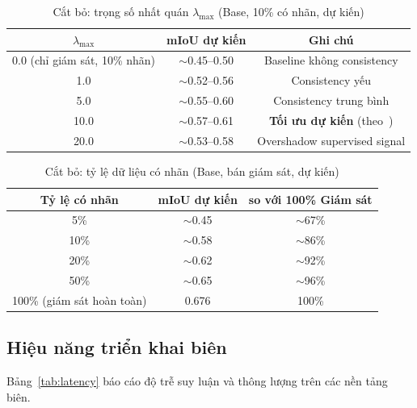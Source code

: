 \documentclass[conference]{IEEEtran}
\begin{document}
\begin{table}[t]
\centering
\caption{Cắt bỏ: trọng số nhất quán $\lambda_{\max}$ (Base, 10\% có nhãn, dự kiến)}
\label{tab:ablation_lambda}
\begin{tabular}{c|c|c}
\toprule
$\lambda_{\max}$ & \textbf{mIoU dự kiến} & \textbf{Ghi chú} \\
\midrule
0.0 (chỉ giám sát, 10\% nhãn) & $\sim$0.45--0.50 & Baseline không consistency \\
1.0  & $\sim$0.52--0.56 & Consistency yếu \\
5.0  & $\sim$0.55--0.60 & Consistency trung bình \\
10.0 & $\sim$0.57--0.61 & \textbf{Tối ưu dự kiến} (theo~\cite{b4}) \\
20.0 & $\sim$0.53--0.58 & Overshadow supervised signal \\
\bottomrule
\end{tabular}
\end{table}

\begin{table}[t]
\centering
\caption{Cắt bỏ: tỷ lệ dữ liệu có nhãn (Base, bán giám sát, dự kiến)}
\label{tab:ablation_ratio}
\begin{tabular}{c|c|c}
\toprule
\textbf{Tỷ lệ có nhãn} & \textbf{mIoU dự kiến} & \textbf{so với 100\% Giám sát} \\
\midrule
5\%   & $\sim$0.45 & $\sim$67\% \\
10\%  & $\sim$0.58 & $\sim$86\% \\
20\%  & $\sim$0.62 & $\sim$92\% \\
50\%  & $\sim$0.65 & $\sim$96\% \\
100\% (giám sát hoàn toàn) & 0.676 & 100\% \\
\bottomrule
\end{tabular}
\end{table}

\subsection{Hiệu năng triển khai biên}

Bảng~\ref{tab:latency} báo cáo độ trễ suy luận và thông lượng trên các nền tảng biên.
\end{document}
